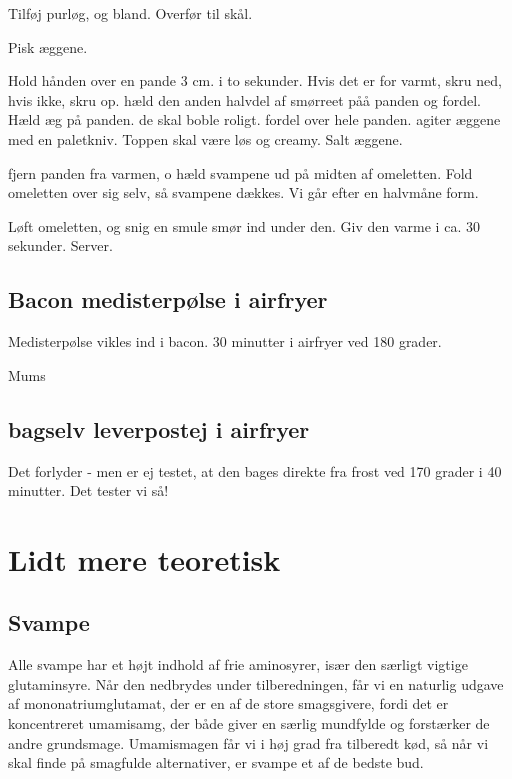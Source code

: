 \documentclass[
]{book}
\begin{document}
Tilføj purløg, og bland. Overfør til skål.

Pisk æggene.

Hold hånden over en pande 3 cm. i to sekunder. Hvis det er for varmt, skru ned, hvis ikke, skru op.
hæld den anden halvdel af smørreet påå panden og fordel.
Hæld æg på panden. de skal boble roligt. fordel over hele panden. agiter æggene med en paletkniv.
Toppen skal være løs og creamy. Salt æggene.

fjern panden fra varmen, o hæld svampene ud på midten af omeletten.
Fold omeletten over sig selv, så svampene dækkes. Vi går efter en halvmåne form.

Løft omeletten, og snig en smule smør ind under den. Giv den varme i ca. 30 sekunder. Server.

\section{Bacon medisterpølse i airfryer}\label{bacon-medisterpuxf8lse-i-airfryer}

Medisterpølse vikles ind i bacon.
30 minutter i airfryer ved 180 grader.

Mums

\section{bagselv leverpostej i airfryer}\label{bagselv-leverpostej-i-airfryer}

Det forlyder - men er ej testet, at den bages direkte fra
frost ved 170 grader i 40 minutter.
Det tester vi så!

\chapter{Lidt mere teoretisk}\label{lidt-mere-teoretisk}

\section{Svampe}\label{svampe}

Alle svampe har et højt indhold af frie aminosyrer, især den særligt vigtige
glutaminsyre. Når den nedbrydes under tilberedningen, får vi en naturlig
udgave af mononatriumglutamat, der er en af de store smagsgivere, fordi det er
koncentreret umamisamg, der både giver en særlig mundfylde og forstærker de
andre grundsmage. Umamismagen får vi i høj grad fra tilberedt kød, så når vi
skal finde på smagfulde alternativer, er svampe et af de bedste bud.
\end{document}

